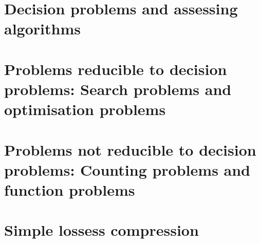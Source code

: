 \documentclass[oneside]{book}
\begin{document}
\part{Decision problems and assessing algorithms}








\part{Problems reducible to decision problems: Search problems and optimisation problems}



\part{Problems not reducible to decision problems: Counting problems and function problems}





\part{Simple lossess compression}

\end{document}

